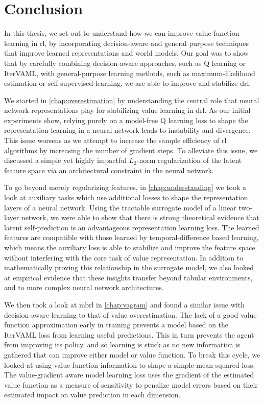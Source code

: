 \chapter{Conclusion}
\label{chap:conclusion}

In this thesis, we set out to understand how we can improve value function learning in \ac{rl}, by incorporating decision-aware and general purpose techniques that improve learned representations and world models.
Our goal was to show that by carefully combining decision-aware approaches, such as Q learning or IterVAML, with general-purpose learning methods, such as maximum-likelihood estimation or self-supervised learning, we are able to improve and stabilize \ac{drl}.

We started in \autoref{chap:overestimation} by understanding the central role that neural network representations play for stabilizing value learning in \ac{drl}.
As our initial experiments show, relying purely on a model-free Q learning loss to shape the representation learning in a neural network leads to instability and divergence.
This issue worsens as we attempt to increase the sample efficiency of \ac{rl} algorithms by increasing the number of gradient steps.
To alleviate this issue, we discussed a simple yet highly impactful $L_2$-norm regularization of the latent feature space via an architectural constraint in the neural network.

To go beyond merely regularizing features, in \autoref{chap:understanding} we took a look at auxiliary tasks which use additional losses to shape the representation layers of a neural network.
Using the tractable surrogate model of a linear two-layer network, we were able to show that there is strong theoretical evidence that latent self-prediction is an advantageous representation learning loss.
The learned features are compatible with those learned by temporal-difference based learning, which means the auxiliary loss is able to stabilize and improve the feature space without interfering with the core task of value representation.
In addition to mathematically proving this relationship in the surrogate model, we also looked at empirical evidence that these insights transfer beyond tabular environments, and to more complex neural network architectures.

We then took a look at \ac{mbrl} in \autoref{chap:vagram} and found a similar issue with decision-aware learning to that of value overestimation.
The lack of a good value function approximation early in training prevents a model based on the IterVAML loss from learning useful predictions.
This in turn prevents the agent from improving its policy, and so learning is stuck as no new information is gathered that can improve either model or value function.
To break this cycle, we looked at using value function information to shape a simple mean squared loss.
The value-gradient aware model learning loss uses the gradient of the estimated value function as a measure of sensitivity to penalize model errors based on their estimated impact on value prediction in each dimension.

